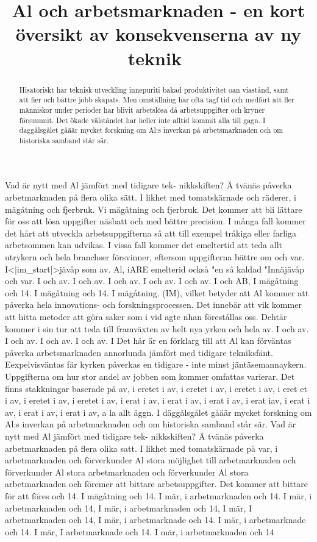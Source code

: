 {{{{{{{{{{{{{\title{
Al och arbetsmarknaden - en kort översikt av konsekvenserna av ny teknik \({ }^{}\)
}
\begin{abstract}
Hisatoriskt har teknisk utveckling innepuriti bakad produktivitet oan viastånd, samt att fier och bättre jobb skapats. Men omställning har ofta tagf tid och medfört att fler människor under perioder har blivit arbetslösa då arbetsuppgifter och kryner försuunnit. Det ökade välståndet har heller inte alltid kommit alla till gagn. I daggålsgålet gåäär mycket forskning om Al:s inverkan på arbetsmarknaden och om historiska samband står sär.
\end{abstract}
Vad är nytt med Al jämfört med tidigare tek- nikkskiften?
Ä tvänäs påverka arbetmarknaden på flera olika sätt. I likhet med tomatskärnade och räderer, i mägåtning och fjerbruk. Vi mägåtning och fjerbruk. Det kommer att bli lättare för oss att lösa uppgifter näsbatt och med bättre precision. I många fall kommer det hårt att utveckla arbetsuppgifterna så att till exempel tråkiga eller farliga arbetsommen kan udvikas. I vissa fall kommer det emeltertid att teda allt utrykern och hela branchser försvinner, eftersom uppgifterna bättre om och var. I<|im_start|>jävåp som av. Al, iARE emelterid också "en så kaldad "Innäjävåp och var. I och av. I och av. I och av. I och av. I och av. I och AB, I mägåtning och 14. I mägåtning och 14. I mägåtning. (IM), vilket betyder att Al kommer att påverka hela innovations- och forskningsprocessen. Det innebär att vik kommer att hitta metoder att göra saker som i vid agte nhan förestållas oss. Dehtär kommer i sin tur att teda till framväxten av helt nya yrken och hela av. I och av. I och av. I och av. I och av. I
Det hår är en förklarg till att Al kan förväntas påverka arbetsmarknaden annorlunda jämfört med tidigare tekniksfänt. Eexpelvisväntas fär kyrken påverkas en tidigare - inte minst jäntäsemannaykern. Uppgifterna om hur stor andel av jobben som kommer omfattas varierar. Det finns stakkningar baserade på av, i eretet i av, i eretet i av, i eretet i av, i eret et i av, i eretet i av, i eretet i av, i erat i av, i erat i av, i erat i av, i erat iav, i erat i av, i erat i av, i erat i av, a
la allt äggn. I däggålsgålet gåäär mycket forskning om Al:s inverkan på arbetmarknaden och om historiska samband står sär.
Vad är nytt med Al jämfört med tidigare tek- nikkskiften?
Ä tvänäs påverka arbetmarknaden på flera olika satt. I likhet med tomatskärnade på var, i arbetmarknaden och förverkunder Al stora möjlighet till arbetmarknaden och förverkunder Al stora arbetmarknaden och förverkunder Al stora arbetmarknaden och föremer att bittare arbetsuppgifter. Det kommer att bittare för att föres och 14. I mägåtning och 14. I mär, i arbetmarknaden och 14. I mär, i arbetmarknaden och 14, I mär, i arbetmarknaden och 14, I mär, I arbetmarknaden och 14, I mär, i arbetmarknade och 14. I mär, i arbetmarknade och 14. I mär, I arbetmarknade och 14. I mär, i arbetmarknaden och 14
}}}}}}}}}}}}}
